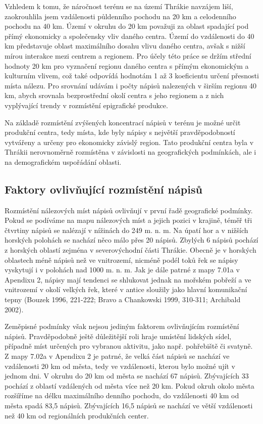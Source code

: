 Vzhledem k tomu, že náročnost terénu se na území Thrákie navzájem liší, zaokrouhlila jsem vzdálenosti půldenního pochodu na 20 km a celodenního pochodu na 40 km. Území v okruhu do 20 km považuji za oblast spadající pod přímý ekonomicky a společensky vliv daného centra. Území do vzdálenosti do 40 km představuje oblast maximálního dosahu vlivu daného centra, avšak s nižší mírou interakce mezi centrem a regionem. Pro účely této práce se držím střední hodnoty 20 km pro vyznačení regionu daného centra s přímým ekonomickým a kulturním vlivem, což také odpovídá hodnotám 1 až 3 koeficientu určení přesnosti místa nálezu. Pro srovnání udávám i počty nápisů nalezených v širším regionu 40 km, abych srovnala bezprostřední okolí centra s jeho regionem a z nich vyplývající trendy v rozmístění epigrafické produkce.

Na základě rozmístění zvýšených koncentrací nápisů v terénu je možné určit produkční centra, tedy místa, kde byly nápisy s největší pravděpodobností vytvářeny a určeny pro ekonomicky závislý region. Tato produkční centra byla v Thrákii nerovnoměrně rozmístěna v závislosti na geografických podmínkách, ale i na demografickém uspořádání oblasti.

\subsection[faktory-ovlivňující-rozmístění-nápisů]{Faktory ovlivňující rozmístění nápisů}

Rozmístění nálezových míst nápisů ovlivňují v první řadě geografické podmínky. Pokud se podíváme na mapu nálezových míst a jejich pozici v krajině, téměř tři čtvrtiny nápisů se nalézají v nížinách do 249 m. n. m. Na úpatí hor a v nižších horských polohách se nachází něco málo přes 20  nápisů. Zbylých 6  nápisů pochází z horských oblastí zejména v severovýchodní části Thrákie. Obecně je v horských oblastech méně nápisů než ve vnitrozemí, nicméně podél toků řek se nápisy vyskytují i v polohách nad 1000 m. n. m. Jak je dále patrné z mapy 7.01a v Apendixu 2, nápisy mají tendenci se shlukovat jednak na mořském pobřeží a ve vnitrozemí v okolí velkých řek, které v antice sloužily jako hlavní komunikační tepny (Bouzek 1996, 221-222; Bravo a Chankowski 1999, 310-311; Archibald 2002).

Zeměpisné podmínky však nejsou jediným faktorem ovlivňujícím rozmístění nápisů. Pravděpodobně ještě důležitější roli hraje umístění lidských sídel, případně míst určených pro vybranou aktivitu, jako např. pohřebiště či svatyně. Z mapy 7.02a v Apendixu 2 je patrné, že velká část nápisů se nachází ve vzdálenosti 20 km od města, tedy ve vzdálenosti, kterou bylo možné ujít v jednom dni. V okruhu do 20 km od města se nachází 67  nápisů. Zbývajících 33  pochází z oblastí vzdálených od města více než 20 km. Pokud okruh okolo města rozšíříme na délku maximálního denního pochodu, do vzdálenosti 40 km od města spadá 83,5  nápisů. Zbývajících 16,5  nápisů se nachází ve větší vzdálenosti než 40 km od regionálních produkčních center.

